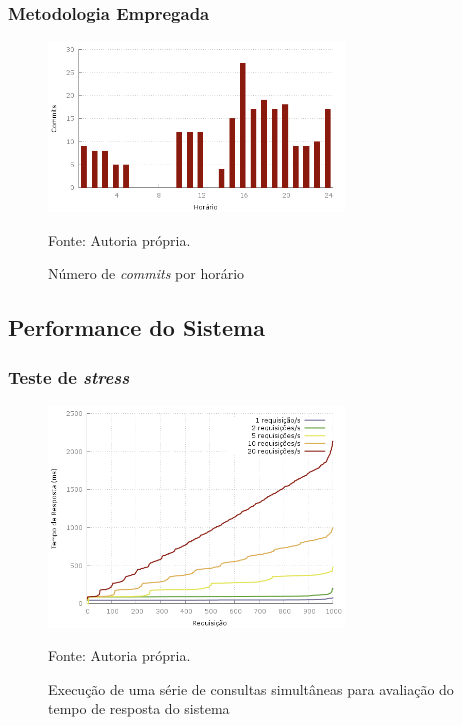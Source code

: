\frame
{
\frametitle{Metodologia Empregada}
\begin{figure}
\includegraphics[width=0.7\textwidth]{./imgs/hour_of_day.png}
\caption{Número de \emph{commits} por horário}
\tiny
Fonte: Autoria própria.
\end{figure}
}

\subsection{Performance do Sistema}
\frame
{
\frametitle{Teste de \emph{stress}}
\begin{figure}
\includegraphics[width=0.7\textwidth]{./imgs/out.png}
\caption{Execução de uma série de consultas simultâneas para avaliação do tempo de resposta do sistema}
\tiny
Fonte: Autoria própria.
\end{figure}
}
